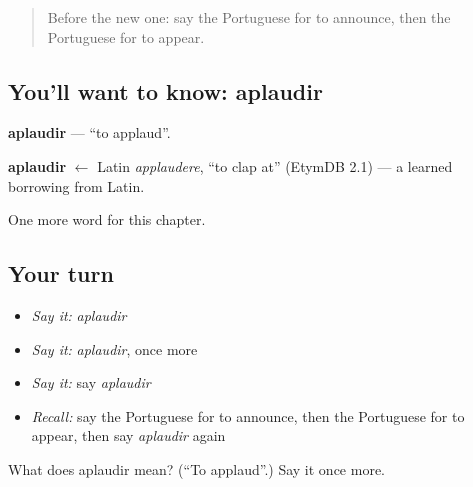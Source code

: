 \begin{quote}
Before the new one: say the Portuguese for to announce, then the Portuguese for to appear.
\end{quote}

\subsection*{You'll want to know: aplaudir}
\textbf{aplaudir} — \textquotedblleft{}to applaud\textquotedblright{}.

\begin{cousinweb}
\textbf{aplaudir} $\leftarrow$ Latin \emph{applaudere}, \textquotedblleft{}to clap at\textquotedblright{} (EtymDB 2.1) — a learned borrowing from Latin.
\end{cousinweb}

\begin{grammarlens}[title={What you've built}]
One more word for this chapter.
\end{grammarlens}

\subsection*{Your turn}
\begin{itemize}
\raggedright
  \item \emph{Say it:} \emph{aplaudir}
  \item \emph{Say it:} \emph{aplaudir}, once more
  \item \emph{Say it:} say \emph{aplaudir}
  \item \emph{Recall:} say the Portuguese for to announce, then the Portuguese for to appear, then say \emph{aplaudir} again
\end{itemize}

\begin{tcolorbox}[breakable,colback=teal!4,colframe=teal!35!black,title={Before you move on}]
What does aplaudir mean? (\textquotedblleft{}To applaud\textquotedblright{}.) Say it once more.
\end{tcolorbox}
